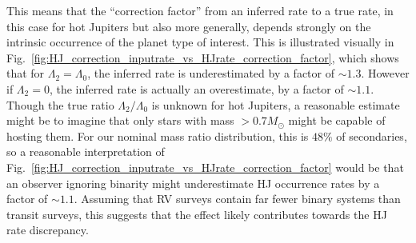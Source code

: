 This means that the ``correction factor'' from an inferred rate to a true 
rate, in this case for hot Jupiters but also more generally, depends strongly 
on the intrinsic occurrence of the planet type of interest.
This is illustrated visually in 
Fig.~\ref{fig:HJ_correction_inputrate_vs_HJrate_correction_factor}, which 
shows that for $\Lambda_2 = \Lambda_0$, the inferred rate is underestimated by 
a factor of $\sim1.3$.
However if $\Lambda_2 = 0$, the inferred rate is actually an overestimate, 
by a factor of $\sim1.1$.
Though the true ratio $\Lambda_2/\Lambda_0$ is unknown for hot Jupiters, a 
reasonable estimate might be to imagine that only stars with mass 
$>0.7M_\odot$ might be capable of hosting them.
For our nominal mass ratio distribution, this is $48\%$ of secondaries, so a 
reasonable interpretation of 
Fig.~\ref{fig:HJ_correction_inputrate_vs_HJrate_correction_factor} would be 
that an observer ignoring binarity might underestimate HJ occurrence rates by 
a factor of $\sim1.1$.
Assuming that RV surveys contain far fewer binary systems than transit 
surveys, this suggests that the effect likely contributes towards the HJ rate 
discrepancy.